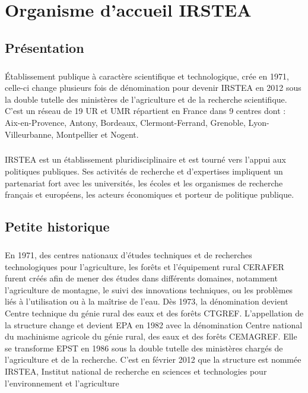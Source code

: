 \chapter{Organisme d’accueil IRSTEA}
\section{Présentation}
\paragraph{}
Établissement publique à caractère scientifique et technologique, crée en 1971, celle-ci change plusieurs fois de dénomination pour devenir \gls{IRSTEA}  en 2012 sous la double tutelle des ministères de l’agriculture et de la recherche scientifique. C’est  un réseau de 19 \gls{UR} et \gls{UMR} répartient en France dans 9 centres dont : Aix-en-Provence, Antony, Bordeaux, Clermont-Ferrand, Grenoble, Lyon-Villeurbanne, Montpellier et Nogent. 
\paragraph{}
IRSTEA est un établissement pluridisciplinaire et est tourné vers l’appui aux politiques publiques. Ses activités de recherche et d’expertises impliquent un partenariat fort avec les universités, les écoles et les organismes de recherche français et européens, les acteurs économiques et porteur de politique publique. 

\section{Petite historique}
\paragraph{}	
En 1971, des centres nationaux d’études techniques et de recherches technologiques pour l’agriculture, les forêts et l’équipement rural \gls{CERAFER} furent créés afin de mener des études dans différents domaines, notamment l’agriculture de montagne, le suivi des innovations techniques, ou les problèmes liés à l’utilisation ou à la maîtrise de l’eau. Dès 1973, la dénomination devient Centre technique du génie rural des eaux et des forêts \gls{CTGREF}.
\newline
L’appellation de la structure change et devient \gls{EPA} en 1982 avec la dénomination Centre national du machinisme agricole du génie rural, des eaux et des forêts \gls{CEMAGREF}. Elle se transforme  \gls{EPST} en 1986 sous la double tutelle des ministères chargés de l’agriculture et de la recherche. C’est en février 2012 que la structure est nommée IRSTEA, Institut national de recherche en sciences et technologies pour l’environnement et l’agriculture

